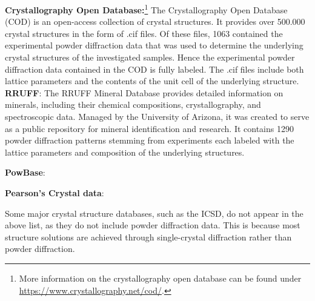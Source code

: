 \textbf{Crystallography Open Database:}\footnote{More information on the crystallography open database can be found under \url{https://www.crystallography.net/cod/}.} The Crystallography Open Database (COD)\cite{Graulis2009cod} is an open-access collection of crystal structures. It provides over 500.000 crystal structures in the form of .cif files. Of these files, 1063 contained the experimental powder diffraction data that was used to determine the underlying crystal structures of the investigated samples. Hence the experimental powder diffraction data contained in the COD is fully labeled. The .cif files include both lattice parameters and the contents of the unit cell of the underlying structure. \\

\textbf{RRUFF}: The RRUFF Mineral Database \cite{Armbruster2015} provides detailed information on minerals, including their chemical compositions, crystallography, and spectroscopic data. Managed by the University of Arizona, it was created to serve as a public repository for mineral identification and research. It contains \num{1290} powder diffraction patterns stemming from experiments each labeled with the lattice parameters and composition of the underlying structures.

\textbf{PowBase}: 

\textbf{Pearson's Crystal data}:

Some major crystal structure databases, such as the ICSD, do not appear in the above list, as they do not include powder diffraction data. This is because most structure solutions are achieved through single-crystal diffraction rather than powder diffraction.
 
